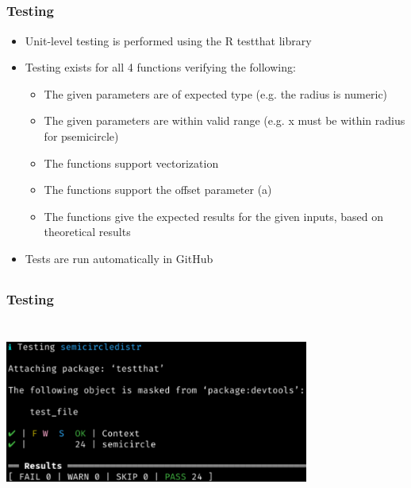 \documentclass[handout, xcolor=dvipsnames]{beamer}
\begin{document}
\subsection{}
\begin{frame}
	\frametitle{Testing}
        \begin{itemize}
            \item Unit-level testing is performed using the R testthat library
            \item Testing exists for all 4 functions verifying the following:
            \begin{itemize}
                \item The given parameters are of expected type (e.g. the radius is numeric)
                \item The given parameters are within valid range (e.g. x must be within radius for psemicircle)
                \item The functions support vectorization
                \item The functions support the offset parameter (a)
                \item The functions give the expected results for the given inputs, based on theoretical results
            \end{itemize}
            \item Tests are run automatically in GitHub
        \end{itemize}
\end{frame}


\subsection{}
\begin{frame}
	\frametitle{Testing}
        \begin{center}
            \includegraphics[width=10cm,height=6cm]{Figures/tests.png}
        \end{center}
\end{frame}
\end{document}
